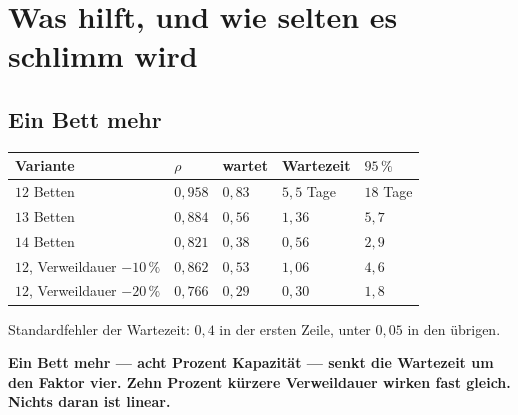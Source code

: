 \chapter{Was hilft, und wie selten es schlimm wird}

\section{Ein Bett mehr}

\begin{merksatz}
\begin{center}
{\small
\renewcommand{\arraystretch}{1.48}
\begin{tabular}{@{}P{3.0cm}P{1.4cm}P{1.6cm}P{2.0cm}P{1.8cm}@{}}
\toprule
\textbf{Variante} & $\rho$ & \textbf{wartet} & \textbf{Wartezeit} & \textbf{$95\,\%$}\\
\midrule
$12$ Betten & $0{,}958$ & $0{,}83$ & $5{,}5$ Tage & $18$ Tage\\
$13$ Betten & $0{,}884$ & $0{,}56$ & $1{,}36$ & $5{,}7$\\
$14$ Betten & $0{,}821$ & $0{,}38$ & $0{,}56$ & $2{,}9$\\
$12$, Verweildauer $-10\,\%$ & $0{,}862$ & $0{,}53$ & $1{,}06$ & $4{,}6$\\
$12$, Verweildauer $-20\,\%$ & $0{,}766$ & $0{,}29$ & $0{,}30$ & $1{,}8$\\
\bottomrule
\end{tabular}}
\end{center}
Standardfehler der Wartezeit: $0{,}4$ in der ersten Zeile, unter $0{,}05$ in den übrigen.

\begin{center}
\begin{minipage}{0.9\textwidth}
\textbf{Ein Bett mehr --- acht Prozent Kapazität --- senkt die Wartezeit um den Faktor vier. Zehn Prozent kürzere Verweildauer wirken fast gleich. Nichts daran ist linear.}
\end{minipage}
\end{center}

\begin{center}
\begin{minipage}{0.88\textwidth}
\end{minipage}
\end{center}
\end{merksatz}

